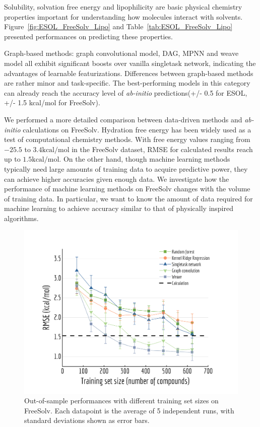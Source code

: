Solubility, solvation free energy and lipophilicity are basic physical chemistry properties important for understanding how molecules interact with solvents. Figure~\ref{fig:ESOL_FreeSolv_Lipo} and Table~\ref{tab:ESOL_FreeSolv_Lipo} presented performances on predicting these properties. 

Graph-based methods: graph convolutional model, DAG, MPNN and weave model all exhibit significant boosts over vanilla singletask network, indicating the advantages of learnable featurizations. Differences between graph-based methods are rather minor and task-specific. The best-performing models in this category can already reach the accuracy level of \textit{ab-initio} predictions(+/- 0.5 for ESOL, +/- 1.5 kcal/mol for FreeSolv).

We performed a more detailed comparison between data-driven methods and \textit{ab-initio} calculations on FreeSolv. Hydration free energy has been widely used as a test of computational chemistry methods. With free energy values ranging from $-25.5$ to $3.4\mbox{kcal/mol}$ in the FreeSolv dataset, RMSE for calculated results reach up to $1.5\mbox{kcal/mol}$.\cite{SAMPL4} On the other hand, though machine learning methods typically need large amounts of training data to acquire predictive power, they can achieve higher accuracies given enough data. We investigate how the performance of machine learning methods on FreeSolv changes with the volume of training data. In particular, we want to know the amount of data required for machine learning to achieve accuracy similar to that of physically inspired algorithms.

\begin{figure}[htbp]
  \centering
  \includegraphics[width=.45\textwidth]{Images/FreeSolv_variable.png}
  \caption{Out-of-sample performances with different training set sizes on FreeSolv. Each datapoint is the average of 5 independent runs, with standard deviations shown as error bars.}
  \label{fig:FreeSolv_variable}
\end{figure}

